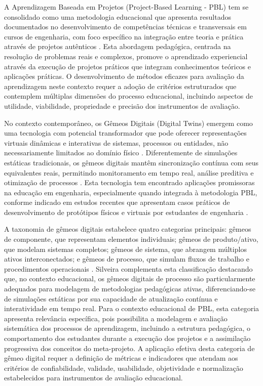 \documentclass[12pt, a4paper, oneside]{abntex2}
\begin{document}
A Aprendizagem Baseada em Projetos (Project-Based Learning - PBL) tem se consolidado como uma metodologia educacional que apresenta resultados documentados no desenvolvimento de competências técnicas e transversais em cursos de engenharia, com foco específico na integração entre teoria e prática através de projetos autênticos \cite{zhang2023, lavado2024, guo2020}. Esta abordagem pedagógica, centrada na resolução de problemas reais e complexos, promove o aprendizado experiencial através da execução de projetos práticos que integram conhecimentos teóricos e aplicações práticas. O desenvolvimento de métodos eficazes para avaliação da aprendizagem neste contexto requer a adoção de critérios estruturados que contemplem múltiplas dimensões do processo educacional, incluindo aspectos de utilidade, viabilidade, propriedade e precisão dos instrumentos de avaliação.

No contexto contemporâneo, os Gêmeos Digitais (Digital Twins) emergem como uma tecnologia com potencial transformador que pode oferecer representações virtuais dinâmicas e interativas de sistemas, processos ou entidades, não necessariamente limitados ao domínio físico \cite{grieves2014, tao2018}. Diferentemente de simulações estáticas tradicionais, os gêmeos digitais mantêm sincronização contínua com seus equivalentes reais, permitindo monitoramento em tempo real, análise preditiva e otimização de processos \cite{silveira2024panorama}. Esta tecnologia tem encontrado aplicações promissoras na educação em engenharia, especialmente quando integrada à metodologia PBL, conforme indicado em estudos recentes que apresentam casos práticos de desenvolvimento de protótipos físicos e virtuais por estudantes de engenharia \cite{bachmann2023}.

A taxonomia de gêmeos digitais estabelece quatro categorias principais: gêmeos de componente, que representam elementos individuais; gêmeos de produto/ativo, que modelam sistemas completos; gêmeos de sistema, que abrangem múltiplos ativos interconectados; e gêmeos de processo, que simulam fluxos de trabalho e procedimentos operacionais \cite{barricelli2019}. Silveira \cite{silveira2024panorama} complementa esta classificação destacando que, no contexto educacional, os gêmeos digitais de processo são particularmente adequados para modelagem de metodologias pedagógicas ativas, diferenciando-se de simulações estáticas por sua capacidade de atualização contínua e interatividade em tempo real. Para o contexto educacional de PBL, esta categoria apresenta relevância específica, pois possibilita a modelagem e avaliação sistemática dos processos de aprendizagem, incluindo a estrutura pedagógica, o comportamento dos estudantes durante a execução dos projetos e a assimilação progressiva dos conceitos do meta-projeto. A aplicação efetiva desta categoria de gêmeo digital requer a definição de métricas e indicadores que atendam aos critérios de confiabilidade, validade, usabilidade, objetividade e normalização estabelecidos para instrumentos de avaliação educacional.
\end{document}
